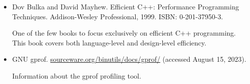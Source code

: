\begin{itemize}
\item
Dov Bulka and David Mayhew. Efficient C++: Performance Programming Techniques. Addison-Wesley Professional, 1999. ISBN: 0-201-37950-3.

One of the few books to focus exclusively on efficient C++ programming. This book covers both language-level and design-level efficiency.

\item
GNU gprof. \url{sourceware.org/binutils/docs/gprof/} (accessed August 15, 2023).

Information about the gprof profiling tool.
\end{itemize}
